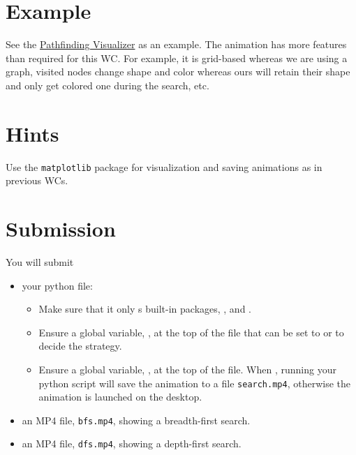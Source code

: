 \documentclass[a4paper]{exam}
\begin{document}
\section*{Example}
See the \href{https://clementmihailescu.github.io/Pathfinding-Visualizer/#}{Pathfinding Visualizer} as an example. The animation has more features than required for this WC. For example, it is grid-based whereas we are using a graph, visited nodes change shape and color whereas ours will retain their shape and only get colored one during the search, etc.

\section*{Hints}
Use the \texttt{matplotlib} package for visualization and saving animations as in previous WCs.


\section*{Submission}
You will submit
\begin{itemize}
\item your python file:
  \begin{itemize}
  \item Make sure that it only s built-in packages, , and .
  \item Ensure a global variable, , at the top of the file that can be set to  or  to decide the strategy.
  \item Ensure a global variable, , at the top of the file. When , running your python script will save the animation to a file \texttt{search.mp4}, otherwise the animation is launched on the desktop.
  \end{itemize}
\item an MP4 file, \texttt{bfs.mp4}, showing a breadth-first search. 
\item an MP4 file, \texttt{dfs.mp4}, showing a depth-first search. 
\end{itemize}
\end{document}
